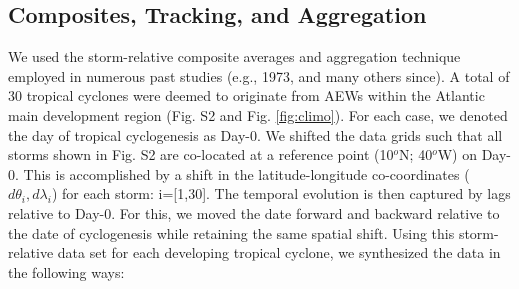 \documentclass[draft]{agujournal2019}
\begin{document}
\subsection{Composites, Tracking, and Aggregation}
We used the storm-relative composite averages and aggregation technique employed in numerous past studies (e.g., \citeauthor{WG1973_Tellus} 1973, and many others since). A total of 30 tropical cyclones were deemed to originate from AEWs within the Atlantic main development region (Fig. S2 and  Fig. \ref{fig:climo}). For each case, we denoted the day of tropical cyclogenesis as Day-0.  We shifted the data grids such that all storms shown in Fig. S2 are co-located at a reference point (10$^o$N; 40$^o$W) on Day-0. This is accomplished by a shift in the latitude-longitude co-coordinates ($d \theta_i, d \lambda_i$) for each storm: i=[1,30]. The temporal evolution is then captured by lags relative to Day-0. For this, we moved the date forward and backward relative to the date of cyclogenesis while retaining the same spatial shift.  Using this storm-relative data set for each developing tropical cyclone, we synthesized the data in the following ways:
\end{document}

